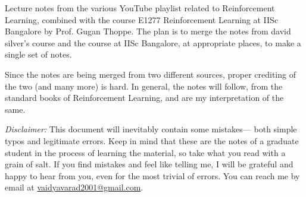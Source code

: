 Lecture notes from the various YouTube playlist related to Reinforcement Learning, combined with the course E1277 Reinforcement Learning at
IISc Bangalore by Prof. Gugan Thoppe. The plan is to merge the notes from david silver's course and the course at IISc Bangalore,
at appropriate places, to make a single set of notes.

Since the notes are being merged from two different sources, proper crediting of the two (and many more) is hard. In general, the notes will follow, 
from the standard books of Reinforcement Learning, and are my interpretation of the same.

\textit{Disclaimer:} This document will inevitably contain some mistakes— both
simple typos and legitimate errors. Keep in mind that these are the notes of a graduate student in the process of learning the material, so take
what you read with a grain of salt. If you find mistakes and feel like telling
me, I will be grateful and happy to hear from you, even for the most trivial of
errors. You can reach me by email at
\href{mailto:vaidyavarad2001@gmail.com}{vaidyavarad2001@gmail.com}.